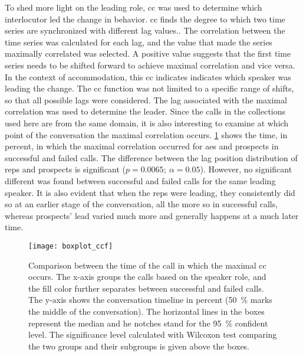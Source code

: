 To shed more light on the leading role, \acl{cc} was used to determine which interlocutor led the change in behavior.
\Acl{cc} finds the degree to which two time series are synchronized with different lag values..
The correlation between the time series was calculated for each lag, and the value that made the series maximally correlated was selected.
A positive value suggests that the first time series needs to be shifted forward to achieve maximal correlation and vice versa.
In the context of accommodation, this \acl{cc} indicates indicates which speaker was leading the change.
The \acl{cc} function was not limited to a specific range of shifts, so that all possible lags were considered.
The lag associated with the maximal correlation was used to determine the leader.
Since the calls in the collections used here are from the same domain, it is also interesting to examine at which point of the conversation the maximal correlation occurs.
\cref{fig:barplot_conv_leaders} shows the time, in percent, in which the maximal correlation occurred for \acp{ae} and prospects in successful and failed calls.
The difference between the lag position distribution of reps and prospects is significant ($p = 0.0065;\ \alpha = 0.05$).
However, no significant different was found between successful and failed calls for the same leading speaker.
It is also evident that when the reps were leading, they consistently did so at an earlier stage of the conversation, all the more so in successful calls, whereas prospects' lead varied much more and generally happens at a much later time.
%
\begin{figure}
	\centering
	\texttt{[image: boxplot\_ccf]}
	\caption[Comparison between sales reps' and prospects' leading-taking times for successful and failed calls.]
		{Comparison between the time of the call in which the maximal \acl{cc} occurs.
		The x-axis groups the calls based on the speaker role, and the fill color further separates between successful and failed calls.
		The y-axis shows the conversation timeline in percent (\SI{50}{\percent} marks the middle of the conversation).
		The horizontal lines in the boxes represent the median
		and he notches stand for the \SI{95}{\percent} confident level.
		The significance level calculated with Wilcoxon test comparing the two groups and their subgroups is given above the boxes.}
	\label{fig:barplot_conv_leaders}
\end{figure}
